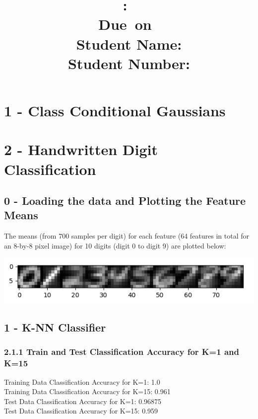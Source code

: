 \documentclass[10pt]{article}
\title{
    \vspace{2in}
    \textmd{\textbf{\hmwkClass:\ \hmwkTitle}}\\
    \vspace{0.1in}\small{Due\ on\ \hmwkDueDate}\\
    \vspace{3in}
    \vspace{0.1in}\large{Student Name: \textbf{\hmwkAuthorName} } \\
    \vspace{0.1in}\large{Student Number: \textbf{\hmwkAuthorNumber} } \\
}
\date{}
\begin{document}
\maketitle
\pagebreak

\begin{center} \tableofcontents \end{center}
\pagebreak

\clearpage
\setcounter{page}{1}

\section{1 - Class Conditional Gaussians}


\section{2 - Handwritten Digit Classification}
\subsection{0 - Loading the data and Plotting the Feature Means}

The means (from 700 samples per digit) for each feature (64 features in total for an 8-by-8 pixel image) for 10 digits (digit 0 to digit 9) are plotted below: 

\begin{center}
\includegraphics[scale=1]{averages.png}
\end{center}


\subsection{1 -  K-NN Classifier}
\subsubsection{2.1.1 Train and Test Classification Accuracy for K=1 and K=15}

Training Data Classification Accuracy for K=1: 1.0
\\
Training Data Classification Accuracy for K=15: 0.961
\\
Test Data Classification Accuracy for K=1: 0.96875
\\
Test Data Classification Accuracy for K=15: 0.959
\end{document}

